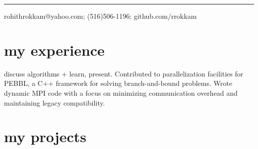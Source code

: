 \documentclass{cv}
\begin{document}
\rule{\textwidth}{0.4pt}
\begin{center}
rohithrokkam@yahoo.com; (516)506-1196; github.com/rrokkam 
\end{center}




%
%

\section{my experience}

\begin{entrylist}
    {discuss algorithms + learn, present.}
    {Contributed to parallelization facilities for PEBBL, a C++ framework for solving branch-and-bound problems. Wrote dynamic MPI code with a focus on minimizing communication overhead and maintaining legacy compatibility.}
\end{entrylist}

\section{my projects}
\end{document}
